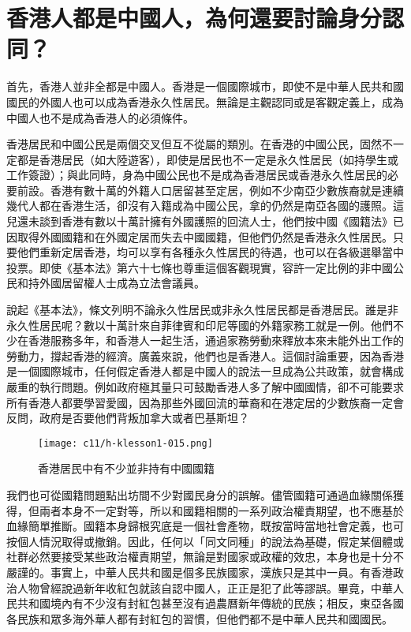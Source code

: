 \section{香港人都是中國人，為何還要討論身分認同？}

首先，香港人並非全都是中國人。香港是一個國際城市，即使不是中華人民共和國國民的外國人也可以成為香港永久性居民。無論是主觀認同或是客觀定義上，成為中國人也不是成為香港人的必須條件。

香港居民和中國公民是兩個交叉但互不從屬的類別。在香港的中國公民，固然不一定都是香港居民（如大陸遊客），即使是居民也不一定是永久性居民（如持學生或工作簽證）；與此同時，身為中國公民也不是成為香港居民或香港永久性居民的必要前設。香港有數十萬的外籍人口居留甚至定居，例如不少南亞少數族裔就是連續幾代人都在香港生活，卻沒有入籍成為中國公民，拿的仍然是南亞各國的護照。這兒還未談到香港有數以十萬計擁有外國護照的回流人士，他們按中國《國籍法》已因取得外國國籍和在外國定居而失去中國國籍，但他們仍然是香港永久性居民。只要他們重新定居香港，均可以享有各種永久性居民的待遇，也可以在各級選舉當中投票。即使《基本法》第六十七條也尊重這個客觀現實，容許一定比例的非中國公民和持外國居留權人士成為立法會議員。

說起《基本法》，條文列明不論永久性居民或非永久性居民都是香港居民。誰是非永久性居民呢？數以十萬計來自菲律賓和印尼等國的外籍家務工就是一例。他們不少在香港服務多年，和香港人一起生活，通過家務勞動來釋放本來未能外出工作的勞動力，撐起香港的經濟。廣義來說，他們也是香港人。這個討論重要，因為香港是一個國際城市，任何假定香港人都是中國人的說法一旦成為公共政策，就會構成嚴重的執行問題。例如政府極其量只可鼓勵香港人多了解中國國情，卻不可能要求所有香港人都要學習愛國，因為那些外國回流的華裔和在港定居的少數族裔一定會反問，政府是否要他們背叛加拿大或者巴基斯坦？

\begin{figure}[htbp]
    \centering
    \texttt{[image: c11/h-klesson1-015.png]}
    \caption{香港居民中有不少並非持有中國國籍} 
\end{figure}

我們也可從國籍問題點出坊間不少對國民身分的誤解。儘管國籍可通過血緣關係獲得，但兩者本身不一定對等，所以和國籍相關的一系列政治權責期望，也不應基於血緣簡單推斷。國籍本身歸根究底是一個社會產物，既按當時當地社會定義，也可按個人情況取得或撤銷。因此，任何以「同文同種」的說法為基礎，假定某個體或社群必然要接受某些政治權責期望，無論是對國家或政權的效忠，本身也是十分不嚴謹的。事實上，中華人民共和國是個多民族國家，漢族只是其中一員。有香港政治人物曾經說過新年收紅包就該自認中國人，正正是犯了此等謬誤。畢竟，中華人民共和國境內有不少沒有封紅包甚至沒有過農曆新年傳統的民族；相反，東亞各國各民族和眾多海外華人都有封紅包的習慣，但他們都不是中華人民共和國國民。

